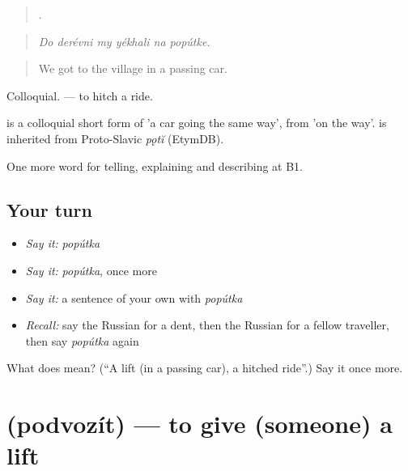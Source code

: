 \begin{quote}
     .
\end{quote}

\begin{quote}
\emph{Do derévni my yékhali na popútke.}
\end{quote}

\begin{quote}
We got to the village in a passing car.
\end{quote}

Colloquial. \emph{ } — to hitch a ride.

\begin{cousinweb}
\emph{} is a colloquial short form of \emph{ } 'a car going the same way', from \emph{ } 'on the way'. \emph{} is inherited from Proto-Slavic \emph{pǫtĭ} (EtymDB).
\end{cousinweb}

\begin{grammarlens}[title={What you've built}]
One more word for telling, explaining and describing at B1.
\end{grammarlens}

\subsection*{Your turn}
\begin{itemize}
\raggedright
  \item \emph{Say it:} \emph{popútka}
  \item \emph{Say it:} \emph{popútka}, once more
  \item \emph{Say it:} a sentence of your own with \emph{popútka}
  \item \emph{Recall:} say the Russian for a dent, then the Russian for a fellow traveller, then say \emph{popútka} again
\end{itemize}

\begin{tcolorbox}[breakable,colback=teal!4,colframe=teal!35!black,title={Before you move on}]
What does  mean? (\textquotedblleft{}A lift (in a passing car), a hitched ride\textquotedblright{}.) Say it once more.
\end{tcolorbox}
\section[\texorpdfstring{\ru{подвозить} (podvozít)}{подвозить (podvozít)}]{ (podvozít) — to give (someone) a lift}

